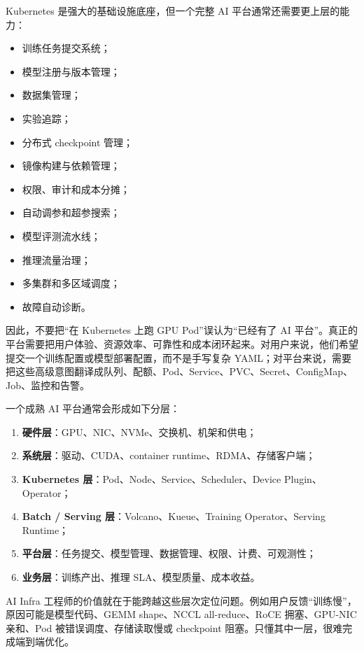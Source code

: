 Kubernetes 是强大的基础设施底座，但一个完整 AI 平台通常还需要更上层的能力：

\begin{itemize}
  \item 训练任务提交系统；
  \item 模型注册与版本管理；
  \item 数据集管理；
  \item 实验追踪；
  \item 分布式 checkpoint 管理；
  \item 镜像构建与依赖管理；
  \item 权限、审计和成本分摊；
  \item 自动调参和超参搜索；
  \item 模型评测流水线；
  \item 推理流量治理；
  \item 多集群和多区域调度；
  \item 故障自动诊断。
\end{itemize}

因此，不要把“在 Kubernetes 上跑 GPU Pod”误认为“已经有了 AI 平台”。真正的平台需要把用户体验、资源效率、可靠性和成本闭环起来。对用户来说，他们希望提交一个训练配置或模型部署配置，而不是手写复杂 YAML；对平台来说，需要把这些高级意图翻译成队列、配额、Pod、Service、PVC、Secret、ConfigMap、Job、监控和告警。

一个成熟 AI 平台通常会形成如下分层：

\begin{enumerate}
  \item \textbf{硬件层}：GPU、NIC、NVMe、交换机、机架和供电；
  \item \textbf{系统层}：驱动、CUDA、container runtime、RDMA、存储客户端；
  \item \textbf{Kubernetes 层}：Pod、Node、Service、Scheduler、Device Plugin、Operator；
  \item \textbf{Batch / Serving 层}：Volcano、Kueue、Training Operator、Serving Runtime；
  \item \textbf{平台层}：任务提交、模型管理、数据管理、权限、计费、可观测性；
  \item \textbf{业务层}：训练产出、推理 SLA、模型质量、成本收益。
\end{enumerate}

AI Infra 工程师的价值就在于能跨越这些层次定位问题。例如用户反馈“训练慢”，原因可能是模型代码、GEMM shape、NCCL all-reduce、RoCE 拥塞、GPU-NIC 亲和、Pod 被错误调度、存储读取慢或 checkpoint 阻塞。只懂其中一层，很难完成端到端优化。

